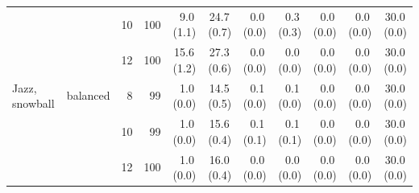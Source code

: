 \begin{table}[p]
{\begin{tabular}{llrrrrrrrrr}
 &  & 10 & 100 & 9.0\,{\scriptsize(1.1)} & 24.7\,{\scriptsize(0.7)} & 0.0\,{\scriptsize(0.0)} & 0.3\,{\scriptsize(0.3)} & 0.0\,{\scriptsize(0.0)} & 0.0\,{\scriptsize(0.0)} & 30.0\,{\scriptsize(0.0)} \\
 &  & 12 & 100 & 15.6\,{\scriptsize(1.2)} & 27.3\,{\scriptsize(0.6)} & 0.0\,{\scriptsize(0.0)} & 0.0\,{\scriptsize(0.0)} & 0.0\,{\scriptsize(0.0)} & 0.0\,{\scriptsize(0.0)} & 30.0\,{\scriptsize(0.0)} \\
\addlinespace[1pt]
Jazz, snowball & balanced & 8 & 99 & 1.0\,{\scriptsize(0.0)} & 14.5\,{\scriptsize(0.5)} & 0.1\,{\scriptsize(0.0)} & 0.1\,{\scriptsize(0.0)} & 0.0\,{\scriptsize(0.0)} & 0.0\,{\scriptsize(0.0)} & 30.0\,{\scriptsize(0.0)} \\
 &  & 10 & 99 & 1.0\,{\scriptsize(0.0)} & 15.6\,{\scriptsize(0.4)} & 0.1\,{\scriptsize(0.1)} & 0.1\,{\scriptsize(0.1)} & 0.0\,{\scriptsize(0.0)} & 0.0\,{\scriptsize(0.0)} & 30.0\,{\scriptsize(0.0)} \\
 &  & 12 & 100 & 1.0\,{\scriptsize(0.0)} & 16.0\,{\scriptsize(0.4)} & 0.0\,{\scriptsize(0.0)} & 0.0\,{\scriptsize(0.0)} & 0.0\,{\scriptsize(0.0)} & 0.0\,{\scriptsize(0.0)} & 30.0\,{\scriptsize(0.0)} \\
\bottomrule
\end{tabular}}
\end{table}
